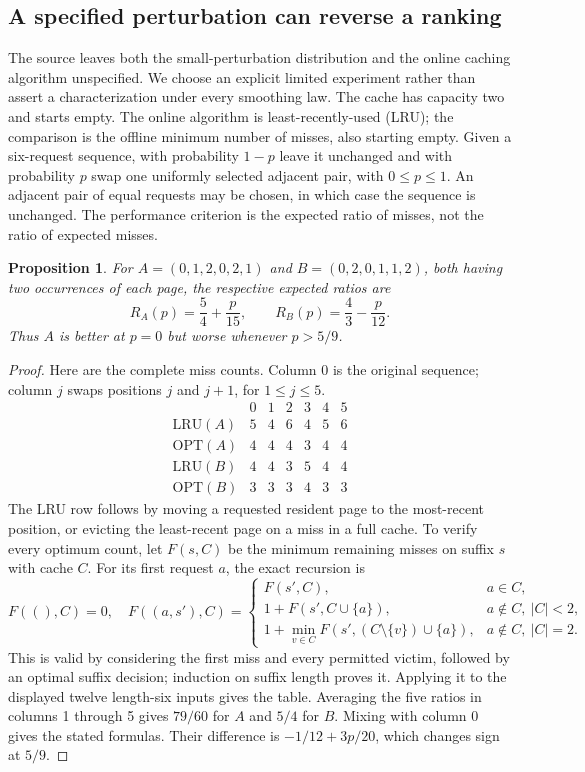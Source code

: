 \documentclass[11pt]{article}
\newtheorem{proposition}{Proposition}
\begin{document}
\subsection{A specified perturbation can reverse a ranking}
The source leaves both the small-perturbation distribution and the online caching algorithm unspecified. We choose an explicit limited experiment rather than assert a characterization under every smoothing law. The cache has capacity two and starts empty. The online algorithm is least-recently-used (LRU); the comparison is the offline minimum number of misses, also starting empty. Given a six-request sequence, with probability $1-p$ leave it unchanged and with probability $p$ swap one uniformly selected adjacent pair, with $0\le p\le1$. An adjacent pair of equal requests may be chosen, in which case the sequence is unchanged. The performance criterion is the expected ratio of misses, not the ratio of expected misses.
\begin{proposition}
For $A=(0,1,2,0,2,1)$ and $B=(0,2,0,1,1,2)$, both having two occurrences of each page, the respective expected ratios are
\[
R_A(p)=\frac54+\frac{p}{15},\qquad R_B(p)=\frac43-\frac{p}{12}.
\]
Thus $A$ is better at $p=0$ but worse whenever $p>5/9$.
\end{proposition}
\begin{proof}
Here are the complete miss counts. Column 0 is the original sequence; column $j$ swaps positions $j$ and $j+1$, for $1\le j\le5$.
\[
\begin{array}{c|rrrrrr}
 &0&1&2&3&4&5\\\hline
\mathrm{LRU}(A)&5&4&6&4&5&6\\
\mathrm{OPT}(A)&4&4&4&3&4&4\\
\mathrm{LRU}(B)&4&4&3&5&4&4\\
\mathrm{OPT}(B)&3&3&3&4&3&3
\end{array}
\]
The LRU row follows by moving a requested resident page to the most-recent position, or evicting the least-recent page on a miss in a full cache. To verify every optimum count, let $F(s,C)$ be the minimum remaining misses on suffix $s$ with cache $C$. For its first request $a$, the exact recursion is
\[
F((),C)=0,\quad
F((a,s'),C)=\begin{cases}
F(s',C),&a\in C,\\
1+F(s',C\cup\{a\}),&a\notin C,\ |C|<2,\\
1+\min_{v\in C}F(s',(C\setminus\{v\})\cup\{a\}),&a\notin C,\ |C|=2.
\end{cases}
\]
This is valid by considering the first miss and every permitted victim, followed by an optimal suffix decision; induction on suffix length proves it. Applying it to the displayed twelve length-six inputs gives the table. Averaging the five ratios in columns 1 through 5 gives $79/60$ for $A$ and $5/4$ for $B$. Mixing with column 0 gives the stated formulas. Their difference is $-1/12+3p/20$, which changes sign at $5/9$.
\end{proof}
\end{document}
